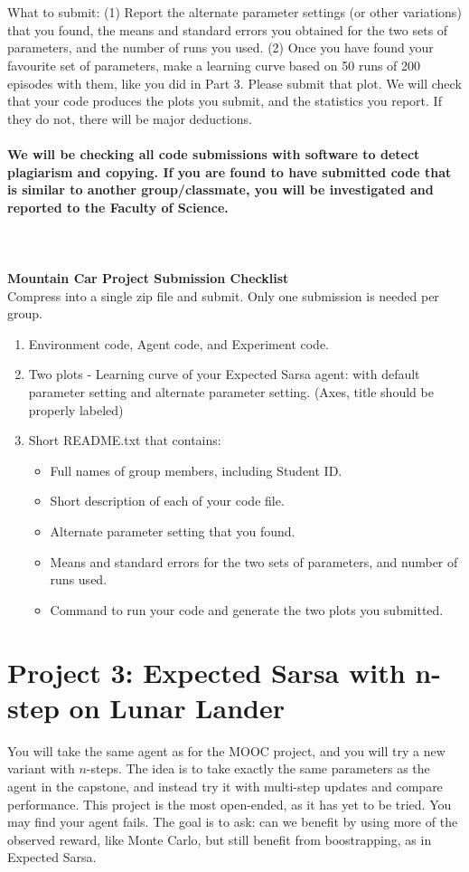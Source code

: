 \documentclass[10pt]{article}
\begin{document}
\\\\
What to submit: (1) Report the alternate parameter settings (or other variations) that you found, the means and standard errors you obtained for the two sets of parameters, and the number of runs you used. (2) Once you have found your favourite set of parameters, make a learning curve based on 50 runs of 200 episodes with them, like you did in Part 3. Please submit that plot. We will check that your code produces the plots you submit, and the statistics you report. If they do not, there will be major deductions.
\\\\
{\bf We will be checking all code submissions with software to detect plagiarism and copying. If you are found to have submitted code that is similar to another group/classmate, you will be investigated and reported to the Faculty of Science.}
\\\\\\\\
{\bf Mountain Car Project Submission Checklist}
\\
Compress into a single zip file and submit. Only one submission is needed per group.
\begin{enumerate}
    \item Environment code, Agent code, and Experiment code.
    \item Two plots - Learning curve of your Expected Sarsa agent: with default parameter setting and alternate parameter setting. (Axes, title should be properly labeled)
    \item Short README.txt that contains:
        \begin{itemize}
            \item Full names of group members, including Student ID.
            \item Short description of each of your code file.
            \item Alternate parameter setting that you found.
            \item Means and standard errors for the two sets of parameters, and number of runs used.
            \item Command to run your code and generate the two plots you submitted.
        \end{itemize}
\end{enumerate}

\section*{Project 3: Expected Sarsa with n-step on Lunar Lander}

You will take the same agent as for the MOOC project, and you will try a new variant with $n$-steps. The idea is to take exactly the same parameters as the agent in the capstone, and instead try it with multi-step updates and compare performance. This project is the most open-ended, as it has yet to be tried. You may find your agent fails. The goal is to ask: can we benefit by using more of the observed reward, like Monte Carlo, but still benefit from boostrapping, as in Expected Sarsa. 
\end{document}
